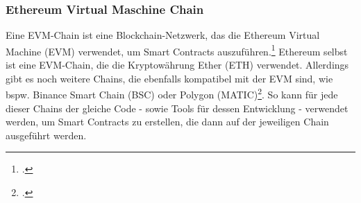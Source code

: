 \subsubsection{Ethereum Virtual Maschine Chain}
\label{sec:definition-evm-chain}
Eine EVM-Chain ist eine Blockchain-Netzwerk, das die Ethereum Virtual Machine (EVM) verwendet, um Smart Contracts auszuführen.\footcite[Vgl. hierzu und im Folgenden][]{w5}
Ethereum selbst ist eine EVM-Chain, die die Kryptowährung Ether (ETH) verwendet. Allerdings gibt es noch weitere Chains, die ebenfalls kompatibel mit der EVM sind, wie bspw. Binance Smart Chain (BSC) oder Polygon (MATIC)\footcite[Vgl.][]{w6}.
So kann für jede dieser Chains der gleiche Code - sowie Tools für dessen Entwicklung - verwendet werden, um Smart Contracts zu erstellen, die dann auf der jeweiligen Chain ausgeführt werden.
